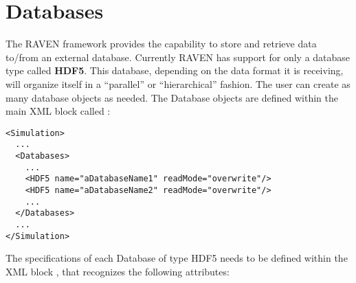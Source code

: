 \section{Databases}
\label{sec:Databases}
The RAVEN framework provides the capability to store and retrieve data to/from
an external database.
%
Currently RAVEN has support for only a database type called \textbf{HDF5}.
%
This database, depending on the data format it is receiving, will organize
itself in a ``parallel'' or ``hierarchical'' fashion.
%
The user can create as many database objects as needed.
%
The Database objects are defined within the main XML block called
:
\begin{lstlisting}[style=XML]
<Simulation>
  ...
  <Databases>
    ...
    <HDF5 name="aDatabaseName1" readMode="overwrite"/>
    <HDF5 name="aDatabaseName2" readMode="overwrite"/>
    ...
  </Databases>
  ...
</Simulation>
\end{lstlisting}
The specifications of each Database of type HDF5 needs to be defined within the
XML block , that recognizes the following attributes:
\vspace{-5mm}
